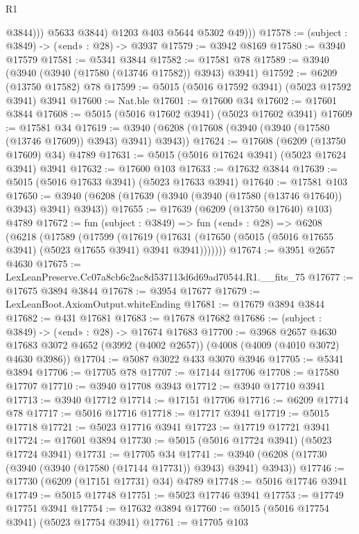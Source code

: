 \begin{lexlean}{R1}
\begin{coremodule}
                  @3844)))
            @5633
            @3844)
          @1203
          @403
          @5644
          @5302
          @49)))
@17578 := (subject : @3849) -> («end» : @28) -> @3937
@17579 := @3942 @8169
@17580 := @3940 @17579
@17581 := @5341 @3844
@17582 := @17581 @78
@17589 := @3940 (@3940 (@3940 (@17580 (@13746 @17582)) @3943) @3941)
@17592 := @6209 (@13750 @17582) @78
@17599 := @5015 (@5016 @17592 @3941) (@5023 @17592 @3941) @3941
@17600 := Nat.ble
@17601 := @17600 @34
@17602 := @17601 @3844
@17608 := @5015 (@5016 @17602 @3941) (@5023 @17602 @3941)
@17609 := @17581 @34
@17619 := @3940 (@6208 (@17608 (@3940 (@3940 (@17580 (@13746 @17609)) @3943) @3941) @3943))
@17624 := @17608 (@6209 (@13750 @17609) @34) @4789
@17631 := @5015 (@5016 @17624 @3941) (@5023 @17624 @3941) @3941
@17632 := @17600 @103
@17633 := @17632 @3844
@17639 := @5015 (@5016 @17633 @3941) (@5023 @17633 @3941)
@17640 := @17581 @103
@17650 := @3940 (@6208 (@17639 (@3940 (@3940 (@17580 (@13746 @17640)) @3943) @3941) @3943))
@17655 := @17639 (@6209 (@13750 @17640) @103) @4789
@17672 := fun (subject : @3849) =>
  fun («end» : @28) =>
  @6208
    (@6218
      (@17589
        (@17599
          (@17619
            (@17631 (@17650 (@5015 (@5016 @17655 @3941) (@5023 @17655 @3941) @3941 @3941)))))))
@17674 := @3951 @2657 @4630
@17675 := LexLeanPreserve.Cc07a8cb6c2ac8d537113d6d69ad70544.R1.__fits_75
@17677 := @17675 @3894 @3844
@17678 := @3954 @17677
@17679 := LexLeanBoot.AxiomOutput.whiteEnding
@17681 := @17679 @3894 @3844
@17682 := @431 @17681
@17683 := @17678 @17682
@17686 := (subject : @3849) -> («end» : @28) -> @17674 @17683
@17700 := @3968
    @2657
    @4630
    @17683
    @3072
    @4652
    (@3992 (@4002 @2657))
    (@4008 (@4009 (@4010 @3072) @4630 @3986))
@17704 := @5087 @3022 @433 @3070 @3946
@17705 := @5341 @3894
@17706 := @17705 @78
@17707 := @17144 @17706
@17708 := @17580 @17707
@17710 := @3940 @17708 @3943
@17712 := @3940 @17710 @3941
@17713 := @3940 @17712
@17714 := @17151 @17706
@17716 := @6209 @17714 @78
@17717 := @5016 @17716
@17718 := @17717 @3941
@17719 := @5015 @17718
@17721 := @5023 @17716 @3941
@17723 := @17719 @17721 @3941
@17724 := @17601 @3894
@17730 := @5015 (@5016 @17724 @3941) (@5023 @17724 @3941)
@17731 := @17705 @34
@17741 := @3940 (@6208 (@17730 (@3940 (@3940 (@17580 (@17144 @17731)) @3943) @3941) @3943))
@17746 := @17730 (@6209 (@17151 @17731) @34) @4789
@17748 := @5016 @17746 @3941
@17749 := @5015 @17748
@17751 := @5023 @17746 @3941
@17753 := @17749 @17751 @3941
@17754 := @17632 @3894
@17760 := @5015 (@5016 @17754 @3941) (@5023 @17754 @3941)
@17761 := @17705 @103

\end{coremodule}
\end{lexlean}
